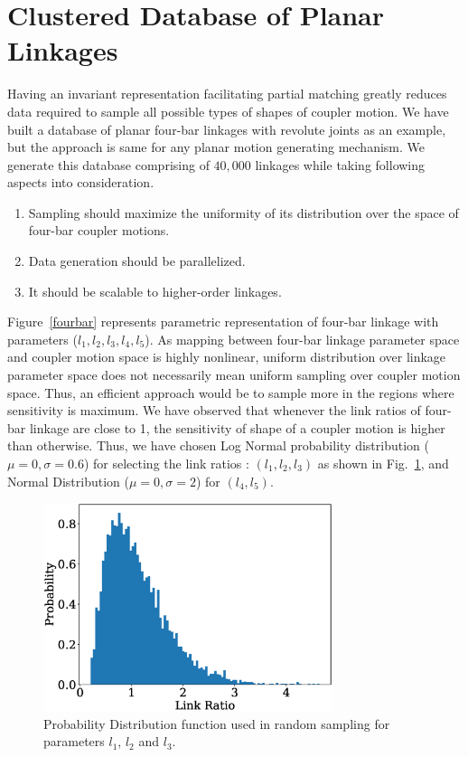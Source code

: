 \documentclass[twocolumn,10pt]{asme2ej}
\begin{document}
\section{Clustered Database of Planar Linkages}\label{sec_db_ae}

Having an invariant representation facilitating partial matching greatly reduces data required to sample all possible types of shapes of coupler motion.
We have built a database of planar four-bar linkages with revolute joints as an example, but the approach is same for any planar motion generating mechanism.
We generate this database comprising of $40,000$ linkages while taking following aspects into consideration.
\begin{enumerate}
  \item Sampling should maximize the uniformity of its distribution over the space of four-bar coupler motions.
  \item Data generation should be parallelized.
  \item It should be scalable to higher-order linkages.
\end{enumerate}
Figure~\ref{fourbar} represents parametric representation of four-bar linkage with parameters ($l_1,l_2,l_3,l_4,l_5$).
As mapping between four-bar linkage parameter space and coupler motion space is highly nonlinear, uniform distribution over linkage parameter space does not necessarily mean uniform sampling over coupler motion space.
Thus, an efficient approach would be to sample more in the regions where sensitivity is maximum.
We have observed that whenever the link ratios of four-bar linkage are close to 1, the sensitivity of shape of a coupler motion is higher than otherwise.
Thus, we have chosen Log Normal probability distribution ($\mu = 0,\sigma = 0.6 $) for selecting the link ratios : $(l_1, l_2, l_3)$ as shown in Fig.~\ref{logNormal}, and Normal Distribution ($\mu = 0,\sigma = 2 $) for $(l_4, l_5)$.

\begin{figure}
\centering
\includegraphics[width=240pt]{figure/fig_logNormal.eps}
  \caption{Probability Distribution function used in random sampling for parameters $l_1$, $l_2$ and $l_3$.}
\label{logNormal}
\end{figure}
\end{document}
